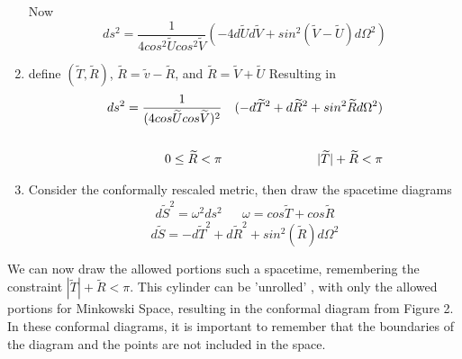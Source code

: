 \documentclass[10pt]{article}
\begin{document}
\begin{enumerate}
               	Now
               	\begin{equation}
               	    ds^2=\frac{1}{4cos^2\widetilde{U}cos^2\widetilde{V}}(-4d\widetilde{U}d\widetilde{V}+sin^2(\widetilde{V}-\widetilde{U})d\Omega^2)
               	\end{equation}
               	
               	\item define \((\widetilde{T},\widetilde{R})\), \(\widetilde{R}=\widetilde{v}-\widetilde{R}\), and \(\widetilde{R}=\widetilde{V}+\widetilde{U}\)
               	Resulting in 
               	\begin{equation}
               	 \begin{align} ds^2=\frac{1}{(4cos\widetilde{U}cos\widetilde{V})^2}&&(-d\widetilde{T}^2+d\widetilde{R}^2+sin^2\widetilde{R}d\Omega^2)\\
               	 \newline\\
               	  0\leq{\widetilde{R}}<\pi && |\widetilde{T}|+\widetilde{R}<\pi
               	  \end{align}
               	\end{equation}
               	\item Consider the conformally rescaled metric, then draw the spacetime diagrams
               	\begin{equation}
               	   \begin{align} d\widetilde{S}^2=\omega^2ds^2 &&  \omega=cos\widetilde{T}+cos\widetilde{R}
               	   \end{align}
               	\end{equation}
               	\begin{equation}
               	    d\widetilde{S}=-d\widetilde{T}^2+d\widetilde{R}^2+sin^2(\widetilde{R})d\Omega^2
               	\end{equation}

             \end{enumerate}
             We can now draw the allowed portions such a spacetime, remembering the constraint $|\widetilde{T}|+\widetilde{R}<\pi$. This cylinder can be 'unrolled' , with only the allowed portions for Minkowski Space, resulting in the conformal diagram from Figure 2. In these conformal diagrams, it is important to remember that the boundaries of the diagram and the points are not included in the space.
\end{document}
